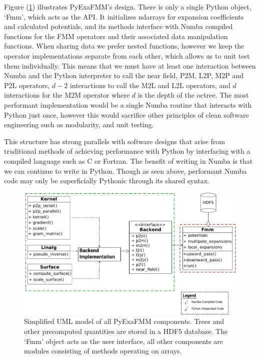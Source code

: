 \documentclass{IEEEcsmag}
\begin{document}
Figure (\ref{fig:design}) illustrates PyExaFMM's design. There is only a single Python object, `Fmm', which acts as the API. It initializes ndarrays for expansion coefficients and calculated potentials, and its methods interface with Numba compiled functions for the FMM operators and their associated data manipulation functions. When sharing data we prefer nested functions, however we keep the operator implementations separate from each other, which allows us to unit test them individually. This means that we must have at least one interaction between Numba and the Python interpreter to call the near field, P2M, L2P, M2P and P2L operators, $d-2$ interactions to call the  M2L and L2L operators, and $d$ interactions for the M2M operator where $d$ is the depth of the octree. The most performant implementation would be a single Numba routine that interacts with Python just once, however this would sacrifice other principles of clean software engineering such as modularity, and unit testing.

This structure has strong parallels with software designs that arise from traditional methods of achieving performance with Python by interfacing with a compiled language such as C or Fortran. The benefit of writing in Numba is that we can continue to write in Python. Though as seen above, performant Numba code may only be superficially Pythonic through its shared syntax.

\begin{figure}
    \centerline{\includegraphics {figures/software.pdf}}
    \caption{Simplified UML model of all PyExaFMM components. Trees and other precomputed quantities are stored in a HDF5 database. The `Fmm' object acts as the user interface, all other components are modules consisting of methods operating on arrays.}
    \label{fig:design}
\end{figure}
\end{document}
